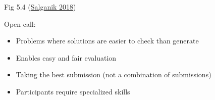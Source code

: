 \documentclass[aspectratio=169]{beamer}
\begin{document}
\begin{frame}

\begin{center}
\end{center}

\vfill
Fig 5.4 (\href{https://www.bitbybitbook.com/}{Salganik 2018})
\end{frame}
\begin{frame}

Open call:
\begin{itemize}
\item Problems where solutions are easier to check than generate
\pause
\item Enables easy and fair evaluation 
\pause
\item Taking the best submission (not a combination of submissions)
\pause
\item Participants require specialized skills 
\end{itemize}

\end{frame}
\end{document}
